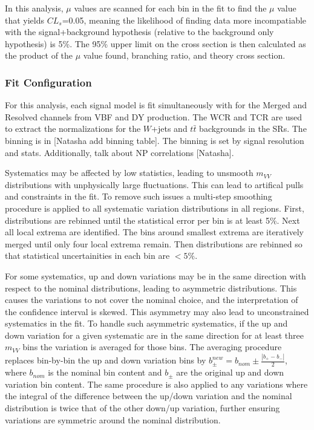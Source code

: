In this analysis, $\mu$ values are scanned for each bin in the fit to find the $\mu$ value that yields $CL_{s}$=0.05, meaning the likelihood of finding data more incompatiable with the signal+background hypothesis (relative to the background only hypothesis) is 5\%. The 95\% upper limit on the cross section is then calculated as the product of the $\mu$ value found, branching ratio, and theory cross section.

\subsubsection{Fit Configuration}
For this analysis, each signal model is fit simultaneously with for the Merged and Resolved channels from VBF and DY production. The WCR and TCR are used to extract the normalizations for the $W$+jets and $t\bar{t}$ backgrounds in the SRs. The binning is in [Natasha add binning table]. The binning is set by signal resolution and stats. Additionally, talk about NP correlations [Natasha]. 

Systematics may be affected by low statistics, leading to unsmooth $m_{VV}$ distributions with unphysically large fluctuations. This can lead to artifical pulls and constraints in the fit. To remove such issues a multi-step smoothing procedure is applied to all systematic variation distributions in all regions. First, distributions are rebinned until the statistical error per bin is at least 5\%. Next all local extrema are identified. The bins around smallest extrema are iteratively merged until only four local extrema remain. Then distributions are rebinned so that statistical uncertainities in each bin are $< 5\%$.

For some systematics, up and down variations may be in the same direction with respect to the nominal distributions, leading to asymmetric distributions. This causes the variations to not cover the nominal choice, and the interpretation of the confidence interval is skewed. This asymmetry may also lead to unconstrained systematics in the fit. To handle such asymmetric systematics, if the up and down variation for a given systematic are in the same direction for at least three $m_{VV}$ bins the variation is averaged for those bins. The averaging procedure replaces bin-by-bin the up and down variation bins by $b_{\pm}^{new}=b_{nom}\pm\frac{|b_{+}-b_{-}|}{2}$, where $b_{nom}$ is the nominal bin content and $b_{\pm}$ are the original up and down variation bin content. The same procedure is also applied to any variations where the integral of the difference between the up/down variation and the nominal distribution is twice that of the other down/up variation, further ensuring variations are symmetric around the nominal distribution.

